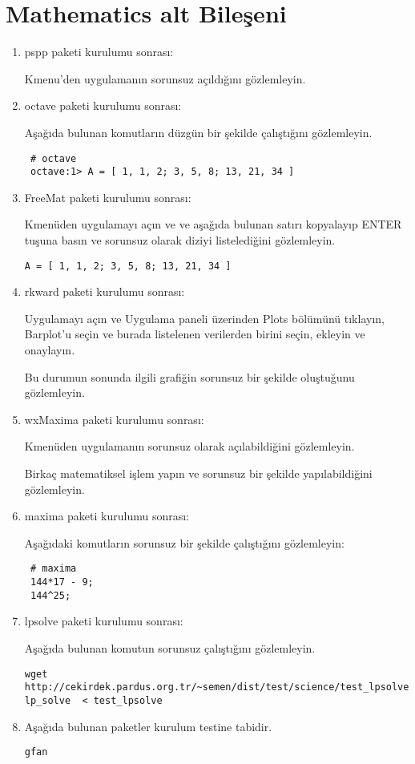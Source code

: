 \documentclass[a4paper,10pt]{article}
\begin{document}
\section{Mathematics alt Bileşeni}
\begin{enumerate}
\item pspp paketi kurulumu sonrası:

Kmenu'den uygulamanın sorunsuz açıldığını gözlemleyin.
\item octave paketi kurulumu sonrası:

Aşağıda bulunan komutların düzgün bir şekilde çalıştığını gözlemleyin.
\begin{verbatim}
 # octave 
 octave:1> A = [ 1, 1, 2; 3, 5, 8; 13, 21, 34 ]
\end{verbatim}

\item FreeMat paketi kurulumu sonrası:

Kmenüden uygulamayı açın ve ve aşağıda bulunan satırı kopyalayıp ENTER tuşuna basın ve sorunsuz olarak diziyi listelediğini gözlemleyin.
\begin{verbatim}
A = [ 1, 1, 2; 3, 5, 8; 13, 21, 34 ]
\end{verbatim}



\item rkward paketi kurulumu sonrası:

Uygulamayı açın ve Uygulama paneli üzerinden Plots bölümünü tıklayın, Barplot'u seçin ve burada listelenen verilerden birini seçin, ekleyin ve onaylayın. 

Bu durumun sonunda ilgili grafiğin sorunsuz bir şekilde oluştuğunu gözlemleyin.

\item wxMaxima paketi kurulumu sonrası:

Kmenüden uygulamanın sorunsuz olarak açılabildiğini gözlemleyin.

Birkaç matematiksel işlem yapın ve sorunsuz bir şekilde yapılabildiğini gözlemleyin.
\item maxima paketi kurulumu sonrası:

Aşağıdaki komutların sorunsuz bir şekilde çalıştığını gözlemleyin:
\begin{verbatim}
 # maxima
 144*17 - 9;
 144^25;
\end{verbatim}
\item lpsolve paketi kurulumu sonrası:

Aşağıda bulunan komutun sorunsuz çalıştığını gözlemleyin.

\begin{verbatim}
wget http://cekirdek.pardus.org.tr/~semen/dist/test/science/test_lpsolve
lp_solve  < test_lpsolve
\end{verbatim}


\item Aşağıda bulunan paketler kurulum testine tabidir.
\begin{verbatim}
gfan 
\end{verbatim}

\end{enumerate}
\end{document}
